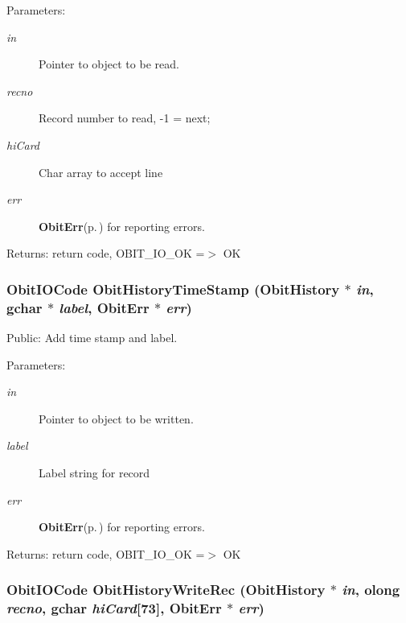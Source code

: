 \begin{Desc}
\item[Parameters:]
\begin{description}
\item[{\em in}]Pointer to object to be read. \item[{\em recno}]Record number to read, -1 = next; \item[{\em hi\-Card}]Char array to accept line \item[{\em err}]{\bf Obit\-Err}{\rm (p.\,\pageref{structObitErr})} for reporting errors. \end{description}
\end{Desc}
\begin{Desc}
\item[Returns:]return code, OBIT\_\-IO\_\-OK =$>$ OK \end{Desc}
\subsubsection{\setlength{\rightskip}{0pt plus 5cm}Obit\-IOCode Obit\-History\-Time\-Stamp ({\bf Obit\-History} $\ast$ {\em in}, gchar $\ast$ {\em label}, {\bf Obit\-Err} $\ast$ {\em err})}\label{ObitHistory_8c_a19}


Public: Add time stamp and label. 

\begin{Desc}
\item[Parameters:]
\begin{description}
\item[{\em in}]Pointer to object to be written. \item[{\em label}]Label string for record \item[{\em err}]{\bf Obit\-Err}{\rm (p.\,\pageref{structObitErr})} for reporting errors. \end{description}
\end{Desc}
\begin{Desc}
\item[Returns:]return code, OBIT\_\-IO\_\-OK =$>$ OK \end{Desc}
\subsubsection{\setlength{\rightskip}{0pt plus 5cm}Obit\-IOCode Obit\-History\-Write\-Rec ({\bf Obit\-History} $\ast$ {\em in}, {\bf olong} {\em recno}, gchar {\em hi\-Card}[73], {\bf Obit\-Err} $\ast$ {\em err})}\label{ObitHistory_8c_a18}


